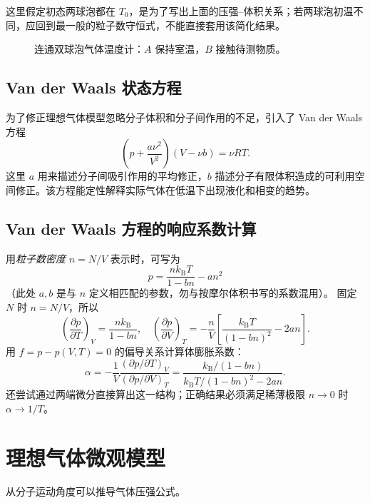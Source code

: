\documentclass[11pt,a4paper,openany]{ctexbook}
\newcommand{\kb}{k_{\mathrm B}}
\begin{document}
\begin{notebox}
这里假定初态两球泡都在 $T_0$，是为了写出上面的压强--体积关系；若两球泡初温不同，应回到最一般的粒子数守恒式，不能直接套用该简化结果。
\end{notebox}

\begin{figure}[htbp]\centering
{}
\caption{连通双球泡气体温度计：$A$ 保持室温，$B$ 接触待测物质。}
\end{figure}

\subsection*{Van der Waals 状态方程}
为了修正理想气体模型忽略分子体积和分子间作用的不足，引入了 Van der Waals 方程
\[
\boxed{\left(p+\frac{a\nu^2}{V^2}\right)(V-\nu b)=\nu RT}.
\]
这里 $a$ 用来描述分子间吸引作用的平均修正，$b$ 描述分子有限体积造成的可利用空间修正。该方程能定性解释实际气体在低温下出现液化和相变的趋势。


\subsection*{Van der Waals 方程的响应系数计算}
用\emph{粒子数密度} $n=N/V$ 表示时，可写为
\[
p=\frac{n\kb T}{1-bn}-an^2
\]
（此处 $a,b$ 是与 $n$ 定义相匹配的参数，勿与按摩尔体积书写的系数混用）。
固定 $N$ 时 $n=N/V$，所以
\[
\left(\frac{\partial p}{\partial T}\right)_V
=\frac{n\kb}{1-bn},
\quad
\left(\frac{\partial p}{\partial V}\right)_T
=-\frac nV\left[\frac{\kb T}{(1-bn)^2}-2an\right].
\]
用 $f=p-p(V,T)=0$ 的偏导关系计算体膨胀系数：
\[
\alpha=-\frac1V
\frac{(\partial p/\partial T)_V}{(\partial p/\partial V)_T}
=\boxed{\frac{\kb/(1-bn)}
{\kb T/(1-bn)^2-2an}}.
\]
还尝试通过两端微分直接算出这一结构；正确结果必须满足稀薄极限 $n\to0$ 时 $\alpha\to1/T$。

\section{理想气体微观模型}
从分子运动角度可以推导气体压强公式。
\end{document}
